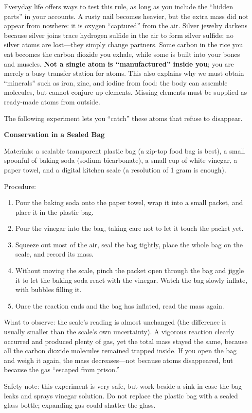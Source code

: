 Everyday life offers ways to test this rule, as long as you include the ``hidden parts'' in your accounts. A rusty nail becomes heavier, but the extra mass did not appear from nowhere: it is oxygen ``captured'' from the air. Silver jewelry darkens because silver joins trace hydrogen sulfide in the air to form silver sulfide; no silver atoms are lost---they simply change partners. Some carbon in the rice you eat becomes the carbon dioxide you exhale, while some is built into your bones and muscles. \textbf{Not a single atom is ``manufactured'' inside you}; you are merely a busy transfer station for atoms. This also explains why we must obtain ``minerals'' such as iron, zinc, and iodine from food: the body can assemble molecules, but cannot conjure up elements. Missing elements must be supplied as ready-made atoms from outside.

The following experiment lets you ``catch'' these atoms that refuse to disappear.

\begin{shiyan}
\textbf{Conservation in a Sealed Bag}

Materials: a sealable transparent plastic bag (a zip-top food bag is best), a small spoonful of baking soda (sodium bicarbonate), a small cup of white vinegar, a paper towel, and a digital kitchen scale (a resolution of 1 gram is enough).

Procedure:
\begin{enumerate}[itemsep=1pt]
\item Pour the baking soda onto the paper towel, wrap it into a small packet, and place it in the plastic bag.
\item Pour the vinegar into the bag, taking care not to let it touch the packet yet.
\item Squeeze out most of the air, seal the bag tightly, place the whole bag on the scale, and record its mass.
\item Without moving the scale, pinch the packet open through the bag and jiggle it to let the baking soda react with the vinegar. Watch the bag slowly inflate, with bubbles filling it.
\item Once the reaction ends and the bag has inflated, read the mass again.
\end{enumerate}

What to observe: the scale's reading is almost unchanged (the difference is usually smaller than the scale's own uncertainty). A vigorous reaction clearly occurred and produced plenty of gas, yet the total mass stayed the same, because all the carbon dioxide molecules remained trapped inside. If you open the bag and weigh it again, the mass decreases---not because atoms disappeared, but because the gas ``escaped from prison.''

Safety note: this experiment is very safe, but work beside a sink in case the bag leaks and sprays vinegar solution. Do not replace the plastic bag with a sealed glass bottle; expanding gas could shatter the glass.
\end{shiyan}

